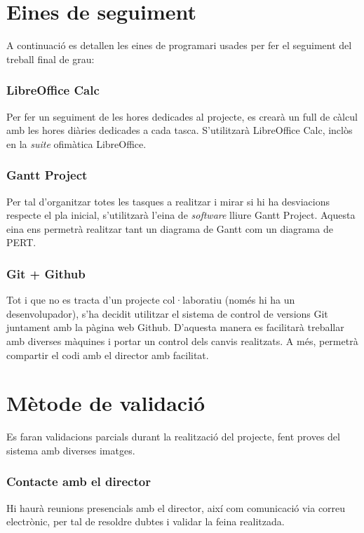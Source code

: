 \section{Eines de seguiment}
	A continuació es detallen les eines de programari usades per fer el seguiment del treball final de grau:
	\subsubsection{LibreOffice Calc}
		Per fer un seguiment de les hores dedicades al projecte, es crearà un full de càlcul amb les hores diàries dedicades a cada tasca. S'utilitzarà LibreOffice Calc, inclòs en
		la \textit{suite} ofimàtica LibreOffice.
	\subsubsection{Gantt Project}
		Per tal d'organitzar totes les tasques a realitzar i mirar si hi ha desviacions respecte el pla inicial, s'utilitzarà l'eina de \textit{software} lliure 
		Gantt Project\cite{GanttProject}. Aquesta eina ens permetrà realitzar tant un diagrama de Gantt com un diagrama de PERT.
	\subsubsection{Git + Github}
		Tot i que no es tracta d'un projecte col·laboratiu (només hi ha un desenvolupador), s'ha decidit utilitzar el sistema de control de versions Git juntament amb la pàgina web Github. 
		D'aquesta manera es facilitarà treballar amb diverses màquines i portar un control dels canvis realitzats. A més, permetrà compartir el codi amb el director amb facilitat.
	\section{Mètode de validació}
		Es faran validacions parcials durant la realització del projecte, fent proves del sistema amb diverses imatges.
	\subsubsection{Contacte amb el director}
		Hi haurà reunions presencials amb el director, així com comunicació via correu electrònic, per tal de resoldre dubtes i validar la feina realitzada.
